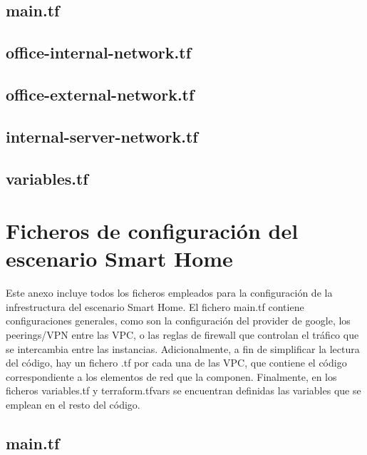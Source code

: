 \section*{main.tf} 


\section*{office-internal-network.tf}


\section*{office-external-network.tf}


\section*{internal-server-network.tf}


\section*{variables.tf}


\chapter{Ficheros de configuración del escenario Smart Home} \label{anx:sh}
  Este anexo incluye todos los ficheros empleados para la configuración de la infrestructura del escenario Smart Home. El fichero main.tf contiene configuraciones generales, como son la configuración del provider de google, los peerings/VPN entre las VPC, o las reglas de firewall que controlan el tráfico que se intercambia entre las instancias. Adicionalmente, a fin de simplificar la lectura del código, hay un fichero .tf por cada una de las VPC, que contiene el código correspondiente a los elementos de red que la componen. Finalmente, en los ficheros variables.tf y terraform.tfvars se encuentran definidas las variables que se emplean en el resto del código.

\section*{main.tf} 


